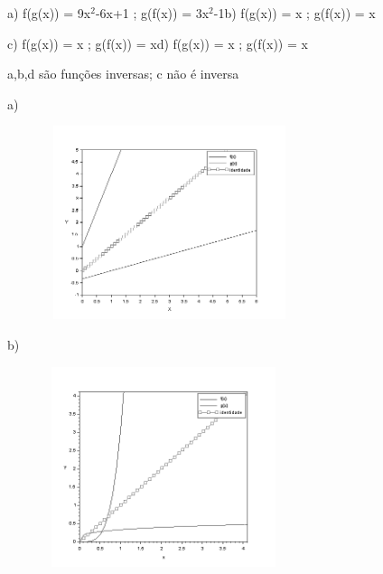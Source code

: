 \begin{respostas}{6}
	\ansitem{} \quad a) f(g(x)) = 9x$^2$-6x+1 ; g(f(x)) = 3x$^2$-1\quad b) f(g(x)) = x ; g(f(x)) = x

\quad c) f(g(x)) = x ; g(f(x)) = x\quad \quad \quad d) f(g(x)) = x ; g(f(x)) = x

    \ansitem{} a,b,d são funções inversas; c não é inversa

    \ansitem{}

a)\begin{figure}[H]
	    \begin{Center}
		    \includegraphics[width=2.91in,height=2.23in]{capitulos/logaritmos_e_funcao_logaritmica/media/image13.png}
	    \end{Center}
    \end{figure}

b)\begin{figure}[H]
    \begin{Center}
        \includegraphics[width=2.77in,height=2.31in]{capitulos/logaritmos_e_funcao_logaritmica/media/image14.png}
    \end{Center}    
\end{figure}
    

\end{respostas}
